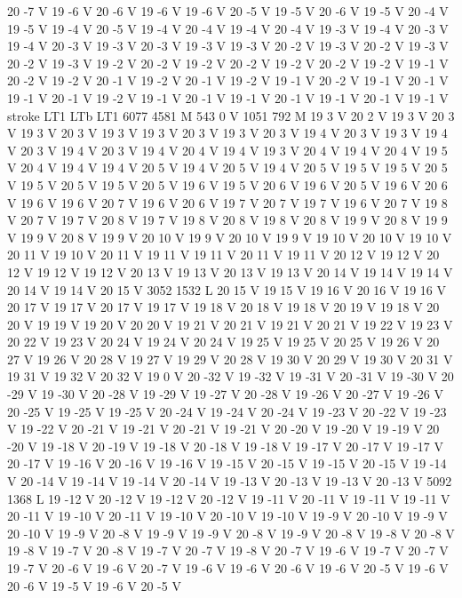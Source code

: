 {{{{{20 -7 V
19 -6 V
20 -6 V
19 -6 V
19 -6 V
20 -5 V
19 -5 V
20 -6 V
19 -5 V
20 -4 V
19 -5 V
19 -4 V
20 -5 V
19 -4 V
20 -4 V
19 -4 V
20 -4 V
19 -3 V
19 -4 V
20 -3 V
19 -4 V
20 -3 V
19 -3 V
20 -3 V
19 -3 V
19 -3 V
20 -2 V
19 -3 V
20 -2 V
19 -3 V
20 -2 V
19 -3 V
19 -2 V
20 -2 V
19 -2 V
20 -2 V
19 -2 V
20 -2 V
19 -2 V
19 -1 V
20 -2 V
19 -2 V
20 -1 V
19 -2 V
20 -1 V
19 -2 V
19 -1 V
20 -2 V
19 -1 V
20 -1 V
19 -1 V
20 -1 V
19 -2 V
19 -1 V
20 -1 V
19 -1 V
20 -1 V
19 -1 V
20 -1 V
19 -1 V
stroke
LT1
LTb
LT1
6077 4581 M
543 0 V
1051 792 M
19 3 V
20 2 V
19 3 V
20 3 V
19 3 V
20 3 V
19 3 V
19 3 V
20 3 V
19 3 V
20 3 V
19 4 V
20 3 V
19 3 V
19 4 V
20 3 V
19 4 V
20 3 V
19 4 V
20 4 V
19 4 V
19 3 V
20 4 V
19 4 V
20 4 V
19 5 V
20 4 V
19 4 V
19 4 V
20 5 V
19 4 V
20 5 V
19 4 V
20 5 V
19 5 V
19 5 V
20 5 V
19 5 V
20 5 V
19 5 V
20 5 V
19 6 V
19 5 V
20 6 V
19 6 V
20 5 V
19 6 V
20 6 V
19 6 V
19 6 V
20 7 V
19 6 V
20 6 V
19 7 V
20 7 V
19 7 V
19 6 V
20 7 V
19 8 V
20 7 V
19 7 V
20 8 V
19 7 V
19 8 V
20 8 V
19 8 V
20 8 V
19 9 V
20 8 V
19 9 V
19 9 V
20 8 V
19 9 V
20 10 V
19 9 V
20 10 V
19 9 V
19 10 V
20 10 V
19 10 V
20 11 V
19 10 V
20 11 V
19 11 V
19 11 V
20 11 V
19 11 V
20 12 V
19 12 V
20 12 V
19 12 V
19 12 V
20 13 V
19 13 V
20 13 V
19 13 V
20 14 V
19 14 V
19 14 V
20 14 V
19 14 V
20 15 V
3052 1532 L
20 15 V
19 15 V
19 16 V
20 16 V
19 16 V
20 17 V
19 17 V
20 17 V
19 17 V
19 18 V
20 18 V
19 18 V
20 19 V
19 18 V
20 20 V
19 19 V
19 20 V
20 20 V
19 21 V
20 21 V
19 21 V
20 21 V
19 22 V
19 23 V
20 22 V
19 23 V
20 24 V
19 24 V
20 24 V
19 25 V
19 25 V
20 25 V
19 26 V
20 27 V
19 26 V
20 28 V
19 27 V
19 29 V
20 28 V
19 30 V
20 29 V
19 30 V
20 31 V
19 31 V
19 32 V
20 32 V
19 0 V
20 -32 V
19 -32 V
19 -31 V
20 -31 V
19 -30 V
20 -29 V
19 -30 V
20 -28 V
19 -29 V
19 -27 V
20 -28 V
19 -26 V
20 -27 V
19 -26 V
20 -25 V
19 -25 V
19 -25 V
20 -24 V
19 -24 V
20 -24 V
19 -23 V
20 -22 V
19 -23 V
19 -22 V
20 -21 V
19 -21 V
20 -21 V
19 -21 V
20 -20 V
19 -20 V
19 -19 V
20 -20 V
19 -18 V
20 -19 V
19 -18 V
20 -18 V
19 -18 V
19 -17 V
20 -17 V
19 -17 V
20 -17 V
19 -16 V
20 -16 V
19 -16 V
19 -15 V
20 -15 V
19 -15 V
20 -15 V
19 -14 V
20 -14 V
19 -14 V
19 -14 V
20 -14 V
19 -13 V
20 -13 V
19 -13 V
20 -13 V
5092 1368 L
19 -12 V
20 -12 V
19 -12 V
20 -12 V
19 -11 V
20 -11 V
19 -11 V
19 -11 V
20 -11 V
19 -10 V
20 -11 V
19 -10 V
20 -10 V
19 -10 V
19 -9 V
20 -10 V
19 -9 V
20 -10 V
19 -9 V
20 -8 V
19 -9 V
19 -9 V
20 -8 V
19 -9 V
20 -8 V
19 -8 V
20 -8 V
19 -8 V
19 -7 V
20 -8 V
19 -7 V
20 -7 V
19 -8 V
20 -7 V
19 -6 V
19 -7 V
20 -7 V
19 -7 V
20 -6 V
19 -6 V
20 -7 V
19 -6 V
19 -6 V
20 -6 V
19 -6 V
20 -5 V
19 -6 V
20 -6 V
19 -5 V
19 -6 V
20 -5 V
}}}}}
